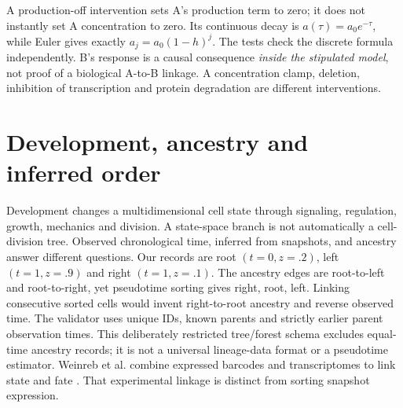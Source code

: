 A production-off intervention sets A's production term to zero; it does not
instantly set A concentration to zero. Its continuous decay is
$a(\tau)=a_0e^{-\tau}$, while Euler gives exactly $a_j=a_0(1-h)^j$.
The tests check the discrete formula independently.
B's response is a causal consequence \emph{inside the stipulated model}, not
proof of a biological A-to-B linkage. A concentration clamp, deletion, inhibition
of transcription and protein degradation are different interventions.

\section{Development, ancestry and inferred order}
Development changes a multidimensional cell state through signaling, regulation,
growth, mechanics and division. A state-space branch is not automatically a
cell-division tree. Observed chronological time,  inferred from
snapshots, and  ancestry answer different questions.
Our records are root $(t=0,z=.2)$, left $(t=1,z=.9)$ and right $(t=1,z=.1)$.
The ancestry edges are root-to-left and root-to-right, yet pseudotime sorting gives
right, root, left. Linking consecutive sorted cells would invent right-to-root
ancestry and reverse observed time.
The validator uses unique IDs, known parents and strictly earlier parent observation
times. This deliberately restricted tree/forest schema excludes equal-time ancestry
records; it is not a universal lineage-data format or a pseudotime estimator.
Weinreb et al. combine expressed barcodes and transcriptomes to link state and
fate \cite{Weinreb2020}. That experimental linkage is distinct from sorting
snapshot expression.

